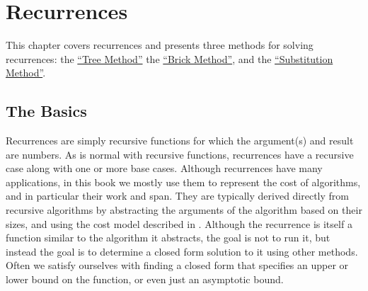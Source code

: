 \chapter{Recurrences}
\label{ch:analysis::recurrences}

\begin{cluster}
\label{grp:prmbl:analysis::recurrences::covers}

\begin{preamble}
\label{prmbl:analysis::recurrences::covers}
This chapter covers recurrences  and presents
three methods for solving recurrences: 
the \href{sec:analysis::recurrences::tree-method}{``Tree Method''}
the \href{sec:analysis::recurrences::brick-method}{``Brick Method''}, and
the \href{sec:analysis::recurrences::master-method}{``Substitution Method''}.

\end{preamble}
\end{cluster}


\section{The Basics}
\label{sec:analysis::recurrences::the-basics}

\begin{cluster}
\label{grp:grm:analysis::recurrences::recurrences}

\begin{gram}
\label{grm:analysis::recurrences::recurrences}
  Recurrences are simply recursive functions for which the argument(s) and
  result are numbers. 
  As is normal with recursive functions, recurrences have a recursive
  case along with one or more base cases.
  Although recurrences have many applications, in this book we mostly use
  them to represent the cost of algorithms, and in particular their
  work and span.
  They are typically derived directly from recursive algorithms by
  abstracting the arguments of the algorithm based on their sizes, and
  using the cost model described in .
  Although the recurrence is itself a function similar to the
  algorithm it abstracts, the goal is not to run it, but instead the
  goal is to determine a closed form solution to it using other
  methods.
  Often we satisfy ourselves with finding a closed form that specifies an
  upper or lower bound on the function, or even just an asymptotic
  bound.

\end{gram}
\end{cluster}

